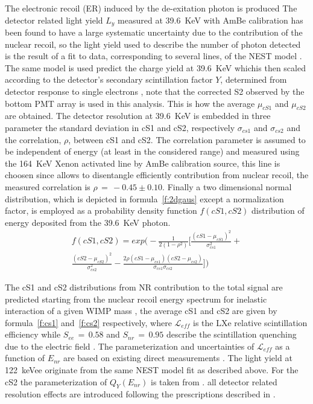 The electronic recoil (ER) induced by the de-exitation photon is produced 
The detector related light yield $L_y$ measured at 39.6~KeV with AmBe calibration has been found to have a large systematic uncertainty
due to the contribution of the nuclear recoil, so the light yield used to describe the number of photon detected is the result of a fit 
to data, corresponding to several lines, of the NEST model \cite{NEST,Geant1,Geant2}. The same model is used predict the charge yield at
39.6~KeV whichis then scaled according to the detector's secondary scintillation factor $Y$, determined from detector response to single electrons \cite{SingleE},
note that the corrected S2 observed by the bottom PMT array is used in this analysis. This is how the average $\mu_{cS1}$ and $\mu_{cS2}$ are obtained. 
The detector resolution at 39.6~KeV is embedded in three parameter the standard deviation in cS1 and cS2, respectively $\sigma_{cs1}$ and $\sigma_{cs2}$ and 
the correlation, $\rho$,  between cS1 and cS2. The correlation parameter is assumed to be independent of energy (at least in the considered range) and measured
using the 164~KeV Xenon activated line by AmBe calibration source, this line is choosen since allows to disentangle efficiently contribution from nuclear recoil,
the measured correlation is $\rho \, = \, -0.45 \pm 0.10$. Finally a two dimensional normal distribution, which is depicted in formula~\ref{f:2dgaus} except a normalization factor, 
is employed as a probability density function $f(cS1,cS2)$ distribution of energy deposited from the 39.6~KeV photon.
\begin{multline}
	f(cS1,cS2)  = exp \Big( -\frac{1}{2(1-\rho^2)} \Big[ \frac{(cS1 - \mu_{cS1})^2}{\sigma_{cs1}^2} + \\ 
	 \frac{(cS2 - \mu_{cS2})^2}{\sigma_{cs2}^2} - \frac{2\rho(cS1 - \mu_{cs1}) (cS2 - \mu_{cs2})} {\sigma_{cs1}\sigma_{cs2}} \Big] \Big) 
\label{f:2dgaus}
\end{multline}


The cS1 and cS2 distributions from NR contribution to the total signal are predicted starting from the nuclear recoil energy spectrum
for inelastic interaction of a given WIMP mass \cite{inelastic_th}, the average cS1 and cS2 are given by formula~\ref{f:cs1} and~\ref{f:cs2} respectively,
where $\mathcal{L}_{eff}$ is the LXe relative scintillation efficiency while $S_{ee} \, = \, 0.58$  and $S_{nr} \, = \, 0.95$ describe the scintillation 
quenching due to the electric field \cite{ScintQuenching}. The parameterization and uncertainties of $\mathcal{L}_{eff}$ as a function of $E_{nr}$ are based on existing 
direct measurements \cite{run8Result}. The light yield at 122~keVee originate from the same NEST model fit as described above. For the cS2 the parameterization 
of $Q_{Y}(E_{nr})$ is taken from \cite{QY}.
all detector related resolution effects are introduced following the prescriptions described in \cite{dataAnalysis}.

